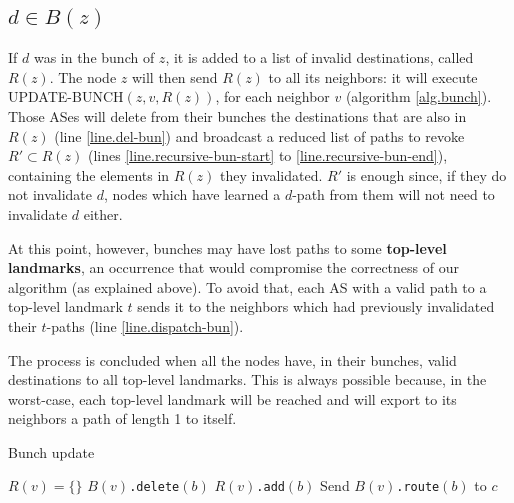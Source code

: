 \documentclass[a4paper,11pt,oneside]{report}
\begin{document}
\subsection{$d \in B(z)$}
If $d$ was in the bunch of $z$, it is added to a list of invalid destinations, called $R(z)$. The node $z$ will then send $R(z)$ to all its neighbors: it will execute \textsc{UPDATE-BUNCH}$(z, v, R(z))$, for each neighbor $v$ (algorithm \ref{alg.bunch}). Those ASes will delete from their bunches the destinations that are also in $R(z)$ (line \ref{line.del-bun}) and broadcast a reduced list of paths to revoke $R' \subset R(z)$ (lines \ref{line.recursive-bun-start} to \ref{line.recursive-bun-end}), containing the elements in $R(z)$ they invalidated. $R'$ is enough since, if they do not invalidate $d$, nodes which have learned a $d$-path from them will not need to invalidate $d$ either.

\bigskip
At this point, however, bunches may have lost paths to some \textbf{top-level landmarks}, an occurrence that would compromise the correctness of our algorithm (as explained above).
To avoid that, each AS with a valid path to a top-level landmark $t$ sends it to the neighbors which had previously invalidated their $t$-paths (line \ref{line.dispatch-bun}).

The process is concluded when all the nodes have, in their bunches, valid destinations to all top-level landmarks. This is always possible because, in the worst-case, each top-level landmark will be reached and will export to its neighbors a path of length 1 to itself.

\begin{algorithm}
\caption{Bunch update} \label{alg.bunch}
\begin{algorithmic}[1]
	\State
	\State $R(v) = \{\}$ 
				\State $B(v)$\texttt{.delete}$(b)$  \label{line.del-bun}
				\State $R(v)$\texttt{.add}$(b)$
			 
				\State Send $B(v)$\texttt{.route}$(b)$ to $c$  \label{line.dispatch-bun}
			\EndIf
		\EndIf
	\EndFor
	\State
	 \label{line.recursive-bun-start}
			\State {}
		\EndFor
	\EndIf \label{line.recursive-bun-end}
	\State
\EndFunction
\end{algorithmic}
\end{algorithm}
\end{document}
